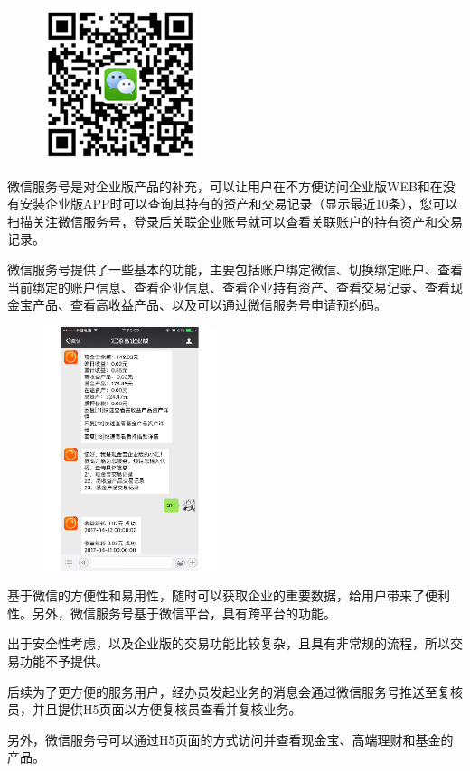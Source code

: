 \begin{figure}
	\includegraphics[scale=0.7]{picture/scanWechat.jpg}
	\label{fig:scanwx}
\end{figure}
微信服务号是对企业版产品的补充，可以让用户在不方便访问企业版WEB和在没有安装企业版APP时可以查询其持有的资产和交易记录（显示最近10条），您可以扫描{}关注微信服务号，登录后关联企业账号就可以查看关联账户的持有资产和交易记录。\par

微信服务号提供了一些基本的功能，主要包括账户绑定微信、切换绑定账户、查看当前绑定的账户信息、查看企业信息、查看企业持有资产、查看交易记录、查看现金宝产品、查看高收益产品、以及可以通过微信服务号申请预约码。\par

\begin{figure}
	\includegraphics[width=0.45\textwidth]{picture/weixin.pdf}
	\label{fig:weixin}
\end{figure}

基于微信的方便性和易用性，随时可以获取企业的重要数据，给用户带来了便利性。另外，微信服务号基于微信平台，具有跨平台的功能。\par

出于安全性考虑，以及企业版的交易功能比较复杂，且具有非常规的流程，所以交易功能不予提供。\par

后续为了更方便的服务用户，经办员发起业务的消息会通过微信服务号推送至复核员，并且提供H5页面以方便复核员查看并复核业务。\par

另外，微信服务号可以通过H5页面的方式访问并查看现金宝、高端理财和基金的产品。

